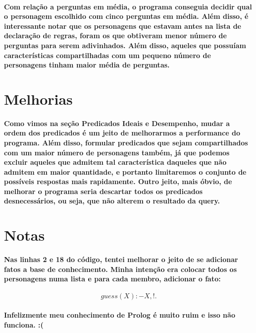\documentclass[a4paper,10pt]{article}
\theoremstyle{plain}
\begin{document}
\paragraph{
  Com relação a perguntas em média, o programa conseguia decidir qual o personagem escolhido com
  cinco perguntas em média. Além disso, é interessante notar que os personagens que estavam antes
  na lista de declaração de regras, foram os que obtiveram menor número de perguntas para serem
  adivinhados. Além disso, aqueles que possuíam características compartilhadas com um pequeno número
  de personagens tinham maior média de perguntas.
}

\section{Melhorias}

\paragraph{
  Como vimos na seção Predicados Ideais e Desempenho, mudar a ordem dos predicados é um jeito de
  melhorarmos a performance do programa. Além disso, formular predicados que sejam compartilhados
  com um maior número de personagens também, já que podemos excluir aqueles que admitem tal característica
  daqueles que não admitem em maior quantidade, e portanto limitaremos o conjunto de possíveis respostas
  mais rapidamente. Outro jeito, mais óbvio, de melhorar o programa seria descartar todos os predicados
  desnecessários, ou seja, que não alterem o resultado da query.
}

\section{Notas}

\paragraph{
  Nas linhas 2 e 18 do código, tentei melhorar o jeito de se adicionar fatos a base de conhecimento.
  Minha intenção era colocar todos os personagens numa lista e para cada membro, adicionar o fato:
}

\begin{equation}
  guess(X) :- X,!.
\end{equation}

\paragraph{
  Infelizmente meu conhecimento de Prolog é muito ruim e isso não funciona. :(
}
\end{document}
